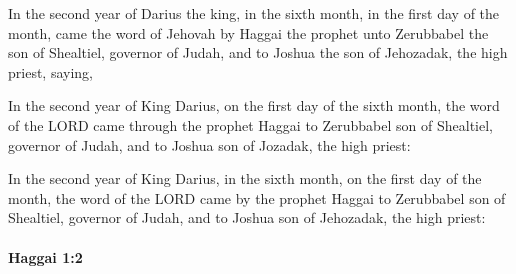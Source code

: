 			\begin{versebox}
					\item[BHS] 
					\item[LXX] 
					\item[ASV] In the second year of Darius the king, in the sixth month, in the first day of the month, came the word of Jehovah by Haggai the prophet unto Zerubbabel the son of Shealtiel, governor of Judah, and to Joshua the son of Jehozadak, the high priest, saying,
					\item[NIV] In the second year of King Darius, on the first day of the sixth month, the word of the LORD came through the prophet Haggai to Zerubbabel son of Shealtiel, governor of Judah, and to Joshua son of Jozadak, the high priest:
					\item[NRSV] In the second year of King Darius, in the sixth month, on the first day of the month, the word of the LORD came by the prophet Haggai to Zerubbabel son of Shealtiel, governor of Judah, and to Joshua son of Jehozadak, the high priest:
			\end{versebox}

		\paragraph{Haggai 1:2} %
			\label{HAGGAI-1-2}

